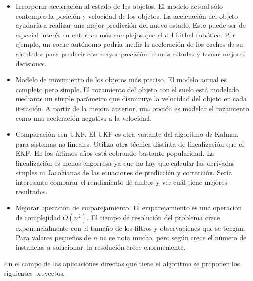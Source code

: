 \begin{itemize}

\item Incorporar aceleración al estado de los objetos. El modelo actual sólo contempla la posición y velocidad de los objetos. La aceleración del objeto ayudaría a realizar una mejor predicción del nuevo estado. Esto puede ser de especial interés en entornos más complejos que el del fútbol robótico. Por ejemplo, un coche autónomo podría medir la aceleración de los coches de su alrededor para predecir con mayor precisión futuros estados y tomar mejores decisiones. 

\item Modelo de movimiento de los objetos más preciso. El modelo actual es completo pero simple. El rozamiento del objeto con el suelo está modelado mediante un simple parámetro que disminuye la velocidad del objeto en cada iteración. A partir de la mejora anterior, una opción es modelar el rozamiento como una aceleración negativa a la velocidad.

\item Comparación con UKF. El UKF es otra variante del algoritmo de Kalman para sistemas no-lineales. Utiliza otra técnica distinta de linealización que el EKF. En los últimos años está cobrando bastante popularidad. La linealización es menos engorrosa ya que no hay que calcular las derivadas simples ni Jacobianas de las ecuaciones de predicción y corrección. Sería interesante comparar el rendimiento de ambos y ver cuál tiene mejores resultados.

\item Mejorar operación de emparejamiento. El emparejamiento es una operación de complejidad $O(n^2)$. El tiempo de resolución del problema crece exponencialmente con el tamaño de los filtros y observaciones que se tengan. Para valores pequeños de $n$ no se nota mucho, pero según crece el número de instancias a solucionar, la resolución crece enormemente.

\end{itemize}

En el campo de las aplicaciones directas que tiene el algoritmo se proponen los siguientes proyectos.

